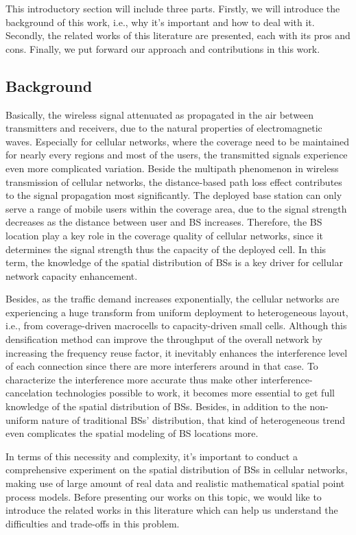 This introductory section will include three parts. Firstly, we will introduce the background of this work, i.e., why it's important and how to deal with it. Secondly, the related works of this literature are presented, each with its pros and cons. Finally, we put forward our approach and contributions in this work.

\subsection{Background}
Basically, the wireless signal attenuated as propagated in the air between transmitters and receivers, due to the natural properties of electromagnetic waves. Especially for cellular networks, where the coverage need to be maintained for nearly every regions and most of the users, the transmitted signals experience even more complicated variation. Beside the multipath phenomenon in wireless transmission of cellular networks, the distance-based path loss effect contributes to the signal propagation most significantly. The deployed base station can only serve a range of mobile users within the coverage area, due to the signal strength decreases as the distance between user and BS increases. Therefore, the BS location play a key role in the coverage quality of cellular networks, since it determines the signal strength thus the capacity of the deployed cell. In this term, the knowledge of the spatial distribution of BSs is a key driver for cellular network capacity enhancement.

Besides, as the traffic demand increases exponentially, the cellular networks are experiencing a huge transform from uniform deployment to heterogeneous layout, i.e., from coverage-driven macrocells to capacity-driven small cells. Although this densification method can improve the throughput of the overall network by increasing the frequency reuse factor, it inevitably enhances the interference level of each connection since there are more interferers around in that case. To characterize the interference more accurate thus make other interference-cancelation technologies possible to work, it becomes more essential to get full knowledge of the spatial distribution of BSs. Besides, in addition to the non-uniform nature of traditional BSs' distribution, that kind of heterogeneous trend even complicates the spatial modeling of BS locations more.

In terms of this necessity and complexity, it's important to conduct a comprehensive experiment on the spatial distribution of BSs in cellular networks, making use of large amount of real data and realistic mathematical spatial point process models. Before presenting our works on this topic, we would like to introduce the related works in this literature which can help us understand the difficulties and trade-offs in this problem.

